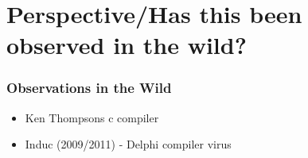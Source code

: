 \section{Perspective/Has this been observed in the wild?}

\begin{frame}
  \frametitle{Observations in the Wild}
%
  \begin{itemize}
  \item Ken Thompsons c compiler
  \item Induc (2009/2011) - Delphi compiler virus
  \end{itemize}
%
\end{frame}

